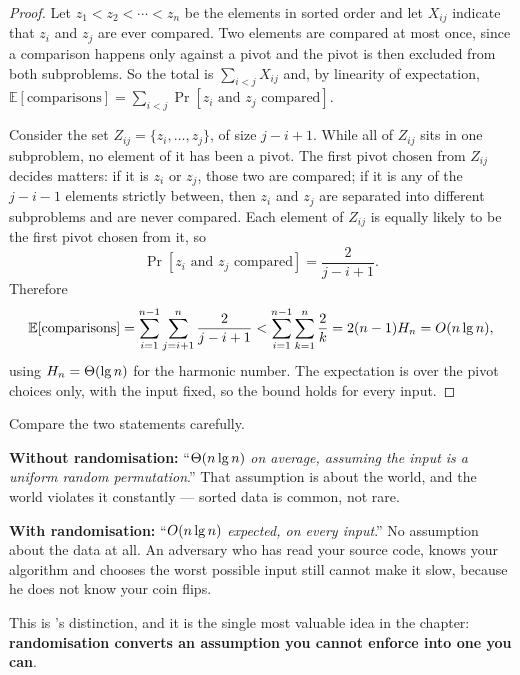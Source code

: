 \begin{proof}
Let $z_{1} < z_{2} < \cdots < z_{n}$ be the elements in sorted order and let
$X_{ij}$ indicate that $z_{i}$ and $z_{j}$ are ever compared. Two elements are
compared at most once, since a comparison happens only against a pivot and the
pivot is then excluded from both subproblems. So the total is $\sum_{i<j}
X_{ij}$ and, by linearity of expectation,
$\mathbb{E}[\text{comparisons}] = \sum_{i<j}\Pr[z_{i} \text{ and } z_{j}
\text{ compared}]$.

\smallskip
Consider the set $Z_{ij} = \{z_{i}, \ldots, z_{j}\}$, of size $j-i+1$. While
all of $Z_{ij}$ sits in one subproblem, no element of it has been a pivot. The
first pivot chosen from $Z_{ij}$ decides matters: if it is $z_{i}$ or $z_{j}$,
those two are compared; if it is any of the $j-i-1$ elements strictly between,
then $z_{i}$ and $z_{j}$ are separated into different subproblems and are never
compared. Each element of $Z_{ij}$ is equally likely to be the first pivot
chosen from it, so
\[ \Pr[z_{i} \text{ and } z_{j} \text{ compared}] = \frac{2}{j-i+1}. \]
Therefore
\[ \mathbb{E}[\text{comparisons}]
   = \sum_{i=1}^{n-1}\sum_{j=i+1}^{n} \frac{2}{j-i+1}
   < \sum_{i=1}^{n-1} \sum_{k=1}^{n} \frac{2}{k}
   = 2(n-1)H_{n} = O(n \operatorname{lg} n), \]
using $H_{n} = \Theta(\operatorname{lg} n)$ for the harmonic number. The expectation is over
the pivot choices only, with the input fixed, so the bound holds for every
input.
\end{proof}

\begin{conceptbox}
Compare the two statements carefully.

\smallskip
\textbf{Without randomisation:} ``$\Theta(n\operatorname{lg} n)$ \emph{on average, assuming
the input is a uniform random permutation}.'' That assumption is about the
world, and the world violates it constantly --- sorted data is common, not
rare.

\smallskip
\textbf{With randomisation:} ``$O(n\operatorname{lg} n)$ \emph{expected, on every
input}.'' No assumption about the data at all. An adversary who has read your
source code, knows your algorithm and chooses the worst possible input still
cannot make it slow, because he does not know your coin flips.

\smallskip
This is 's distinction, and it is the single most valuable idea in
the chapter: \textbf{randomisation converts an assumption you cannot enforce
into one you can}.
\end{conceptbox}

